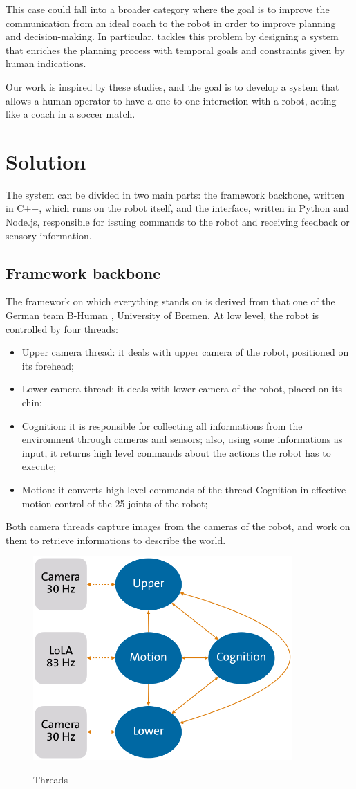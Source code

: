 \documentclass[a4paper, onecolumn, 12pt]{article}
\begin{document}
This case could fall into a broader category where the goal is to improve the
communication from an ideal coach to the robot in order to improve planning and
decision-making. In particular, \cite{musumeci} tackles this problem by
designing a system that enriches the planning process with temporal goals and
constraints given by human indications. 

Our work is inspired by these studies, and the goal is to develop a system that
allows a human operator to have a one-to-one interaction with a robot, acting
like a coach in a soccer match.

\newpage
\section{Solution}
\label{sec:sol}

The system can be divided in two main parts: the framework backbone, written in
C++, which runs on the robot itself, and the interface, written in Python and
Node.js, responsible for issuing commands to the robot and receiving feedback or
sensory information. 

\subsection{Framework backbone}
The framework on which everything stands on is derived from that one of the
German team B-Human \cite{bhuman2023}, University of Bremen. At low level, the robot is 
controlled by four threads:
\begin{itemize}
    \item Upper camera thread: it deals with upper camera of the robot, positioned on its forehead;
    \item Lower camera thread: it deals with lower camera of the robot, placed on its chin;
    \item Cognition: it is responsible for collecting all informations from the 
    environment through cameras and sensors; also, using some informations as input,
    it returns high level commands about the actions the robot has to execute;
    \item Motion: it converts high level commands of the thread Cognition in effective
    motion control of the 25 joints of the robot;
\end{itemize}
Both camera threads capture images from the cameras of the robot, and work on them 
to retrieve informations to describe the world.

\begin{figure}
    \centering
    \includegraphics[width=0.5\linewidth]{assets/threads.png}
    \label{fig:threads}
    \caption{Threads}
\end{figure}
\end{document}
